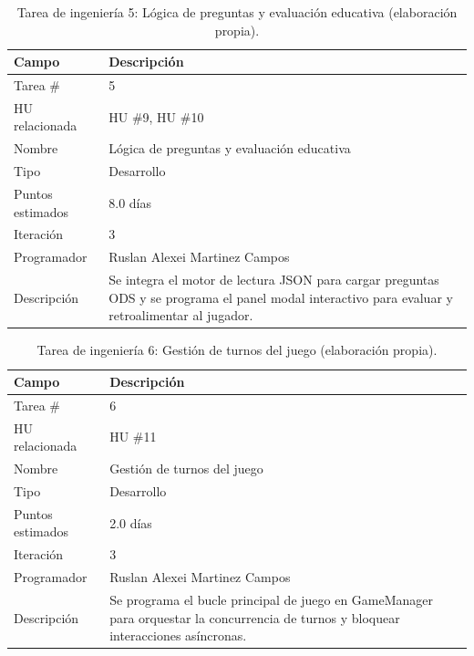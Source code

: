 \begin{table}[H]
\centering
\caption{Tarea de ingeniería 5: Lógica de preguntas y evaluación educativa (elaboración propia).\label{tab:ti5_anexo}}
\begin{tabular}{|p{}|p{}|}
\hline
\textbf{Campo} & \textbf{Descripción} \\
\hline
Tarea \# & 5 \\
\hline
HU relacionada & HU \#9, HU \#10 \\
\hline
Nombre & Lógica de preguntas y evaluación educativa \\
\hline
Tipo & Desarrollo \\
\hline
Puntos estimados & 8.0 días \\
\hline
Iteración & 3 \\
\hline
Programador & Ruslan Alexei Martinez Campos \\
\hline
Descripción & Se integra el motor de lectura JSON para cargar preguntas ODS y se programa el panel modal interactivo para evaluar y retroalimentar al jugador. \\
\hline
\end{tabular}
\end{table}

\begin{table}[H]
\centering
\caption{Tarea de ingeniería 6: Gestión de turnos del juego (elaboración propia).\label{tab:ti6}}
\begin{tabular}{|p{}|p{}|}
\hline
\textbf{Campo} & \textbf{Descripción} \\
\hline
Tarea \# & 6 \\
\hline
HU relacionada & HU \#11 \\
\hline
Nombre & Gestión de turnos del juego \\
\hline
Tipo & Desarrollo \\
\hline
Puntos estimados & 2.0 días \\
\hline
Iteración & 3 \\
\hline
Programador & Ruslan Alexei Martinez Campos \\
\hline
Descripción & Se programa el bucle principal de juego en GameManager para orquestar la concurrencia de turnos y bloquear interacciones asíncronas. \\
\hline
\end{tabular}
\end{table}

